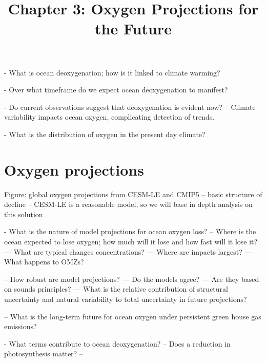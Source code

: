\documentclass[draft,linenumbers]{report_chapter}
\begin{document}
\title{Chapter 3: Oxygen Projections for the Future}



- What is ocean deoxygenation; how is it linked to climate warming?

- Over what timeframe do we expect ocean deoxygenation to manifest?

- Do current observations suggest that deoxygenation is evident now?
	-- Climate variability impacts ocean oxygen, complicating detection of trends.

- What is the distribution of oxygen in the present day climate?

\section{Oxygen projections}

Figure: global oxygen projections from CESM-LE and CMIP5
	-- basic structure of decline
	-- CESM-LE is a reasonable model, so we will base in depth analysis on this solution




- What is the nature of model projections for ocean oxygen loss?
	-- Where is the ocean expected to lose oxygen; how much will it lose and how fast will it lose it?
		--- What are typical changes concentrations?
		--- Where are impacts largest?
		--- What happens to OMZs?

	-- How robust are model projections?
		--- Do the models agree?
		--- Are they based on sounds principles?
		--- What is the relative contribution of structural uncertainty and natural variability to total uncertainty in future projections?

	-- What is the long-term future for ocean oxygen under persistent green house gas emissions?

- What terms contribute to ocean deoxygenation?
	-- Does a reduction in photosynthesis matter?
	--


\end{document}
